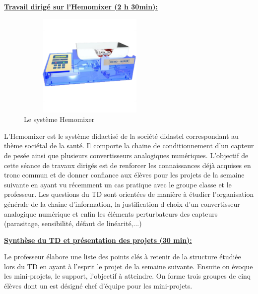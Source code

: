 \documentclass[12pt]{article}
\begin{document}
\begin{adjustwidth}{5em}{0pt}
\color{blue}
\hspace{20pt}\textbf{\underline{Travail dirigé sur l'Hemomixer (2 h 30min):}}\par
\vspace{10pt}
\color{black}
\end{adjustwidth}
\color{black}
\begin{figure}
  \vspace{-30pt}
  \hspace{-0pt}
  \begin{center}
    \includegraphics[width=7cm,height=5cm,trim=0cm 0cm 0cm 0cm, clip=true]{Images_Rapport/hemomixer}
  \end{center}
  \vspace{-5pt}
  \caption{Le système Hemomixer}
  \vspace{-10pt}
\end{figure}




L'Hemomixer est le système didactisé de la société didastel correspondant au thème sociétal de la santé. Il comporte la chaine de conditionnement d'un capteur de pesée ainsi que plusieurs convertisseurs analogiques numériques. L'objectif de cette séance de travaux dirigés est de renforcer les connaissances déjà acquises en tronc commun et de donner confiance aux élèves pour les projets de la semaine suivante en ayant vu récemment un cas pratique avec le groupe classe et le professeur. Les questions du TD sont orientées de manière à étudier l'organisation générale de la chaine d'information, la justification d choix d'un convertisseur analogique numérique et enfin les éléments perturbateurs des capteurs (parasitage, sensibilité, défaut de linéarité,...) 
\par




\newpage

\begin{adjustwidth}{6.5em}{0pt}
\color{blue}
\textbf{\underline{Synthèse du TD et présentation des projets (30 min):}}\par
\vspace{10pt}
\color{black}

Le professeur élabore une liste des points clés à retenir de la structure étudiée lors du TD en ayant à l'esprit le projet de la semaine suivante. Ensuite on évoque les mini-projets, le support, l'objectif à atteindre. On forme trois groupes de cinq élèves dont un est désigné chef d'équipe pour les mini-projets.

\end{adjustwidth}
\par
\vspace{30pt}
\end{document}
